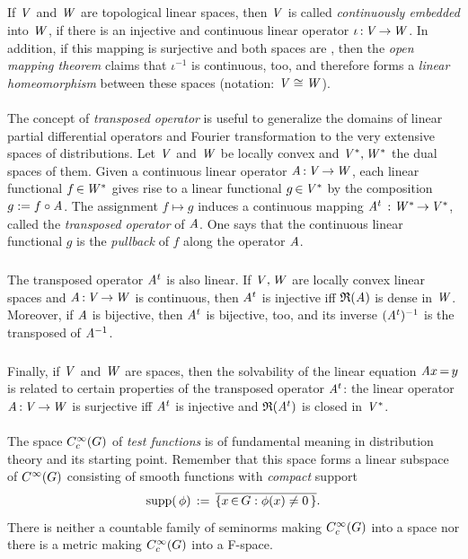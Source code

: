 \documentclass[11pt,twoside]{article}
\def\G{G}
\begin{document}
\subparagraph{} %
If $\mathit{V}$ and $\mathit{W}$ are topological linear spaces,
then $\mathit{V}$ is called \textit{continuously embedded} into $\mathit{W}$,
if there is an injective and continuous linear operator
$\iota {\,:\,} \mathit{V} {\,\to\,} \mathit{W}$.
In addition,
if this mapping is surjective and both spaces are {\FRECHET},
then the \textit{open mapping theorem} claims that $\iota^{-1}$ is continuous,
too,
and therefore forms a \textit{linear homeomorphism}
between these spaces (notation: $\mathit{V} \cong \mathit{W}$).

\paragraph{} %
The concept of \textit{transposed operator} is useful to generalize the domains
of linear partial differential operators and Fourier transformation
to the very extensive spaces of distributions.
Let $\mathit{V}$ and $\mathit{W}$ be locally convex and $\mathit{V}^*, \mathit{W}^*$
the dual spaces of them.
Given a continuous linear operator $\mathit{A} {\,:\,} \mathit{V} {\,\to\,} \mathit{W}$,
each linear functional $f {\,\in\,} \mathit{W}^*$ gives rise to
a linear functional $g {\,\in\,} \mathit{V}^*$ by the composition $g:= f \circ \mathit{A}$.
The assignment $f \mapsto g$ induces a continuous mapping
$\mathit{A}^t \, :\mathit{W}^* {\,\to\,} \mathit{V}^*$,
called the \textit{trans\-posed operator} of $\mathit{A}$.
One says that
the continuous linear functional $g$ is the \textit{pullback} of $f$
along the operator $\mathit{A}$.

\subparagraph{}
The transposed operator $\mathit{A}^t$ is also linear.
If $\mathit{V}, \mathit{W}$ are locally convex linear spaces
and $\mathit{A} {\,:\,} \mathit{V} {\,\to\,} \mathit{W}$ is continuous,
then $\mathit{A}^t$ is injective
iff $\mathfrak{R}(\mathit{A}) $ is dense in $\mathit{W}$.
Moreover,
if $\mathit{A}$ is bijective,
then $\mathit{A}^t$ is bijective, too,
and its inverse $(\mathit{A}^t)^{-1}$ is the transposed of $\mathit{A}^{-1}$.

\subparagraph{}
Finally,
if $\mathit{V}$ and $\mathit{W}$ are {\FRECHET} spaces,
then the solvability of the linear equation $\mathit{A} x {\,=\,} y$ 
is related to certain properties of the transposed operator $\mathit{A}^t$:
the linear operator $\mathit{A} {\,:\,} \mathit{V} {\,\to\,} \mathit{W}$ is surjective
iff
$\mathit{A}^t$ is injective and $\mathfrak{R}(\mathit{A}^t) $ is closed in $\mathit{V}^*$.

\paragraph{} %
The space $\TF$ of \textit{test functions} is of fundamental meaning
in distribution theory and its starting point.
Remember that this space forms a linear subspace of $\SF$
consisting of smooth functions with \textit{compact} support
\[
\supp{\,\phi} \, := \, \overline{\{x \xeof \G: \phi(x) \neq 0\,\} }.
\]
There is neither a countable family of seminorms
making $\TF$ into a {\FRECHET} space nor there is a metric making 
$\TF$ into a F-space.
\end{document}
